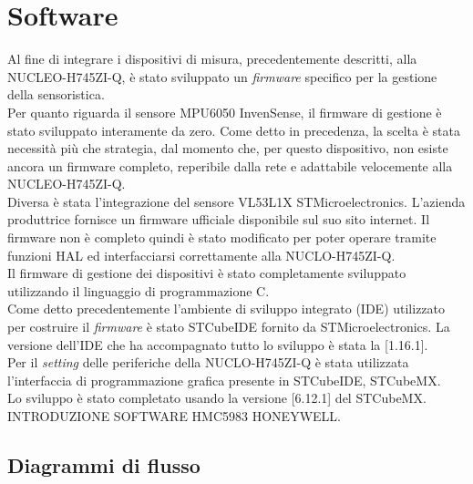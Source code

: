 \documentclass[11pt]{report}
\begin{document}
\chapter{Software}
Al fine di integrare i dispositivi di misura, precedentemente descritti, alla NUCLEO-H745ZI-Q, è stato sviluppato un \textit{firmware} specifico per la gestione della sensoristica.\\
Per quanto riguarda il sensore MPU6050 InvenSense, il firmware di gestione è stato sviluppato interamente da zero. Come detto in precedenza, la scelta è stata necessità più che strategia, dal momento che, per questo dispositivo, non esiste ancora un firmware completo, reperibile dalla rete e adattabile velocemente alla NUCLEO-H745ZI-Q.\\
Diversa è stata l'integrazione del sensore VL53L1X STMicroelectronics. L'azienda produttrice fornisce un firmware ufficiale disponibile sul suo sito internet. Il firmware non è completo quindi è stato modificato per poter operare tramite funzioni HAL ed interfacciarsi correttamente alla NUCLO-H745ZI-Q.\\
Il firmware di gestione dei dispositivi è stato completamente sviluppato utilizzando il linguaggio di programmazione C.\\
Come detto precedentemente l'ambiente di sviluppo integrato (IDE) utilizzato per costruire il \textit{firmware} è stato STCubeIDE fornito da STMicroelectronics. La versione dell'IDE che ha accompagnato tutto lo sviluppo è stata la [1.16.1].\\
Per il \textit{setting} delle periferiche della NUCLO-H745ZI-Q è stata utilizzata l'interfaccia di programmazione grafica presente in STCubeIDE, STCubeMX.\\
Lo sviluppo è stato completato usando la versione [6.12.1] del STCubeMX.\\
INTRODUZIONE SOFTWARE HMC5983 HONEYWELL.

\section{Diagrammi di flusso}
\end{document}
